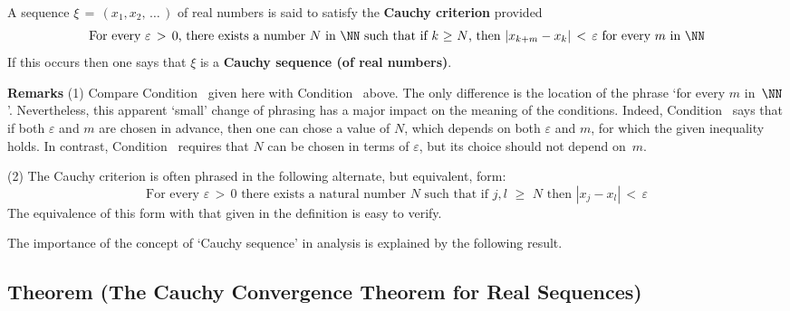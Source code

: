         A sequence ${\xi} \,=\, (x_{1},x_{2},\,{\ldots}\,)$ of real numbers is said to satisfy the {\bf Cauchy criterion} provided
        \begin{equation}
        \label{CondC.100}
        \mbox{For every ${\varepsilon}\,>\,0$, there exists a number $N$ in ${\NN}$ such that if $k\,\,{\geq}\,\,N$,
    then $|x_{k+m}-x_{k}|\,<\,{\varepsilon}$ for every $m$ in~${\NN}$}
        \end{equation}
    If this occurs then one says that ${\xi}$ is a {\bf Cauchy sequence (of real numbers)}.

\VV

        {\bf Remarks} (1) Compare Condition~ given here with Condition~ above.
    The only difference is the location of the phrase `for every $m$ in~${\NN}$'.
    Nevertheless, this apparent `small' change of phrasing has a major impact on the meaning of the conditions.
    Indeed, Condition~ says that if both ${\varepsilon}$ and $m$ are chosen in advance,
    then one can chose a value of $N$, which depends on both ${\varepsilon}$ and $m$, for which the given inequality holds.
    In contrast, Condition~ requires that $N$ can be chosen in terms of ${\varepsilon}$, but its choice should not depend on~$m$.

\V

        (2) The Cauchy criterion is often phrased in the following alternate, but equivalent, form:
        \begin{equation}
        \label{CondC.100A}
        \mbox{For every ${\varepsilon}\,>\,0$ there exists a natural number $N$ such that if $j,l\,\,{\geq}\,\,N$ then $|x_{j}-x_{l}|\,<\,{\varepsilon}$}
        \end{equation}
    The equivalence of this form with that given in the definition is easy to verify. %

\VV

        The importance of the concept of `Cauchy sequence' in analysis is explained by the following result.

\V

            \subsection{\small{\bf Theorem} (The Cauchy Convergence Theorem for Real Sequences)}
            \label{ThmC70.20}

